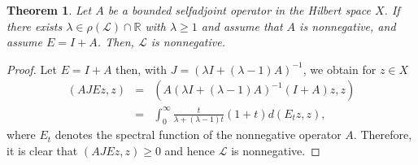 \documentclass{birkjour}
\newtheorem{thm}{Theorem}[section]
\theoremstyle{definition}
\theoremstyle{remark}
\numberwithin{equation}{section}
\newcommand{\Ll}{\mathcal L}
\renewcommand{\geq}{\geqslant}
\begin{document}
\begin{thm} Let $A$ be a bounded selfadjoint operator in the Hilbert space $X$. If there exists $\lambda \in \rho(\mathcal{L}) \cap \mathbb R$ with $\lambda \geq 1$ and assume that $A$ is nonnegative, and assume $E=I+A$. Then, $\mathcal{L}$ is nonnegative. 
\end{thm}
\begin{proof}
    Let $E= I+A$ then, with $J=(\lambda I+ (\lambda -1)A)^{-1}$, we obtain for $z\in X$
\begin{eqnarray*}
    ( AJEz, z) &=& (A(\lambda I+ (\lambda -1)A)^{-1}(I+A)z, z) \\[1ex]
    &=& \int_{0}^\infty \frac{t}{\lambda + (\lambda -1)t}(1+t)d( E_tz,z),
\end{eqnarray*}
where $E_t$ denotes the spectral function of the nonnegative operator $A$.
Therefore, it is clear that $( AJEz, z)\geq 0$ and hence $\Ll$ is nonnegative.
\end{proof}
\end{document}
